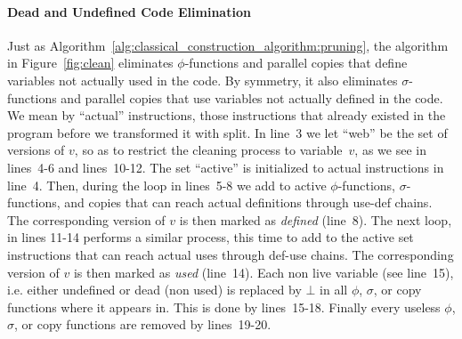 \paragraph{Dead and Undefined Code Elimination}

Just as Algorithm~\ref{alg:classical_construction_algorithm:pruning}, the algorithm in Figure~\ref{fig:clean} eliminates $\phi$-functions and parallel copies that define variables not actually used in the code. By symmetry, it also eliminates $\sigma$-functions  and parallel copies  that use variables not actually defined in the code.
We mean by ``actual'' instructions, those instructions that already existed in the program before we transformed it with {\sf split}.
In line~3 we let ``web'' be the set of versions of $v$, so as to restrict the cleaning process to variable~$v$, as we see in lines~4-6 and lines~10-12.
The set ``active'' is initialized to actual instructions in line~4.
Then, during the loop in lines~5-8 we add to active $\phi$-functions, $\sigma$-functions, and copies that can reach actual definitions through use-def chains.
The corresponding version of $v$ is then marked as \emph{defined} (line~8).
The next loop, in lines 11-14 performs a similar process, this time to add to the active set instructions that can reach actual uses through def-use chains.
The corresponding version of $v$ is then marked as \emph{used} (line~14).
Each non live variable (see line~15), i.e. either undefined or dead (non used) is replaced by $\bot$ in all $\phi$, $\sigma$, or copy functions where it appears in.
This is done by lines~15-18.
Finally every useless $\phi$, $\sigma$, or copy functions are removed by lines~19-20. 


